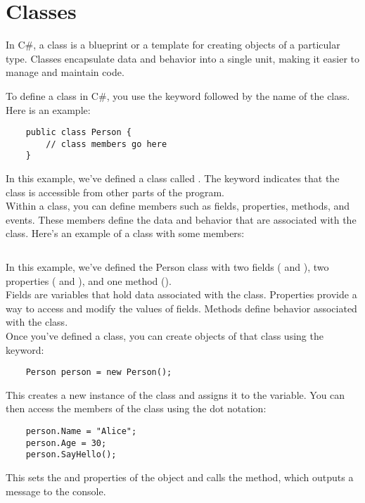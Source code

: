 \documentclass{report}
\begin{document}
\section{Classes}
In C\#, a class is a blueprint or a template for creating objects of a particular type. Classes encapsulate data and behavior into a single unit, making it easier to manage and maintain code.

To define a class in C\#, you use the  keyword followed by the name of the class. Here is an example:

\begin{verbatim}
    public class Person {
        // class members go here
    }
\end{verbatim}

In this example, we've defined a class called . The  keyword indicates that the class is accessible from other parts of the program.\\

Within a class, you can define members such as fields, properties, methods, and events. These members define the data and behavior that are associated with the class. Here's an example of a class with some members:

\inputminted{csharp}{./code/classes.cs}

In this example, we've defined the Person class with two fields ( and ), two properties ( and ), and one method ().\\

Fields are variables that hold data associated with the class. Properties provide a way to access and modify the values of fields. Methods define behavior associated with the class.\\
Once you've defined a class, you can create objects of that class using the  keyword:
\begin{verbatim}
    Person person = new Person();
\end{verbatim}

This creates a new instance of the  class and assigns it to the  variable. You can then access the members of the class using the dot notation:

\begin{verbatim}
    person.Name = "Alice";
    person.Age = 30;
    person.SayHello();
\end{verbatim}

This sets the  and  properties of the  object and calls the  method, which outputs a message to the console.
\end{document}
